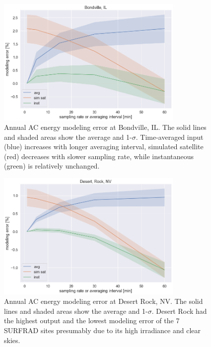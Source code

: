 \documentclass[conference]{IEEEtran}
\begin{document}
\begin{figure}[htbp]
\centerline{\includegraphics[width=9cm]{analysis/bon_all.png}}
\caption{Annual AC energy modeling error at Bondville, IL. The solid lines and shaded areas show the average and 1-$\sigma$. Time-averaged input (blue) increases with longer averaging interval, simulated satellite (red) decreases with slower sampling rate, while instantaneous (green) is relatively unchanged.}
\label{fig:bon2010}
\end{figure}

\begin{figure}[htbp]
\centerline{\includegraphics[width=9cm]{analysis/dra_all.png}}
\caption{Annual AC energy modeling error at Desert Rock, NV. The solid lines and shaded areas show the average and 1-$\sigma$. Desert Rock had the highest output and the lowest modeling error of the 7 SURFRAD sites presumably due to its high irradiance and clear skies.}
\label{fig:dra2011}
\end{figure}
\end{document}

